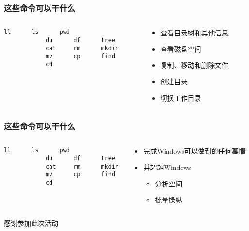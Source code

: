 \begin{CJK}{UTF8}{gbsn}
\begin{frame} [fragile]
	\frametitle{这些命令可以干什么}
	\linespread{1.5}
	\begin{columns}[T]
		\begin{column}[T]{.5\textwidth}
			\begin{lstlisting}[style=bashstyle, gobble=12, texcl]
			ll		ls		pwd
			du		df		tree
			cat		rm		mkdir
			mv		cp		find
			cd
			\end{lstlisting}
		\end{column}
		\begin{column}[T]{.5\textwidth}
			\begin{itemize}
			\item 查看目录树和其他信息
			\item 查看磁盘空间
			\item 复制、移动和删除文件
			\item 创建目录
			\item 切换工作目录
			\end{itemize}
		\end{column}
	\end{columns}
\end{frame}

\begin{frame} [fragile]
	\frametitle{这些命令可以干什么}
	\linespread{1.5}
	\begin{columns}[T]
		\begin{column}[T]{.5\textwidth}
			\begin{lstlisting}[style=bashstyle, gobble=12, texcl]
			ll		ls		pwd
			du		df		tree
			cat		rm		mkdir
			mv		cp		find
			cd
			\end{lstlisting}
		\end{column}
		\begin{column}[T]{.5\textwidth}
			\begin{itemize}
			\item 完成Windows可以做到的任何事情
			\item 并超越Windows
				\begin{itemize}
				\item 分析空间
				\item 批量操纵
				\end{itemize}
			\end{itemize}
		\end{column}
	\end{columns}
\end{frame}

\PreLastFrame
\begin{frame}
	\centerline{\fontsize{32}{32}\selectfont 感谢参加此次活动}
\end{frame}

\newpage
\end{CJK}


